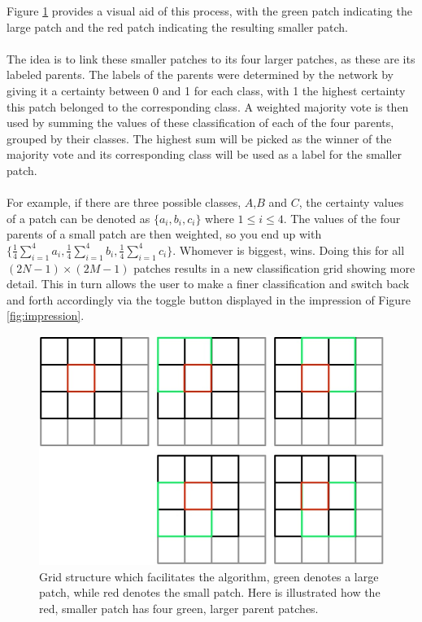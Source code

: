 \documentclass[a4paper,onecolumn]{report}
\begin{document}
Figure \ref{fig:grid} provides a visual aid of this process, with the green patch indicating the large patch and the red patch indicating the resulting smaller patch.\\
\\
The idea is to link these smaller patches to its four larger patches, as these are its labeled parents. The labels of the parents were determined by the network by giving it a certainty between 0 and 1 for each class, with 1 the highest certainty this patch belonged to the corresponding class.
A weighted majority vote is then used by summing the values of these classification of each of the four parents, grouped by their classes. The highest sum will be picked as the winner of the majority vote and its corresponding class will be used as a label for the smaller patch.\\
\\
For example, if there are three possible classes, $A$,$B$ and $C$, the certainty values of a patch can be denoted as $\{a_i, b_i, c_i\}$ where $1 \leq i \leq 4$. The values of the four parents of a small patch are then weighted, so you end up with $\{ \frac{1}{4}\sum_{i=1}^{4} a_i, \frac{1}{4}\sum_{i=1}^{4} b_i, \frac{1}{4}\sum_{i=1}^{4} c_i\}$. Whomever is biggest, wins. Doing this for all $(2N - 1) \times (2M - 1)$ patches results in a new classification grid showing more detail. This in turn allows the user to make a finer classification and switch back and forth accordingly via the toggle button displayed in the impression of Figure \ref{fig:impression}.

\begin{figure}[h!]
    \centering
    \includegraphics[scale=0.6]{./images/grid_explained.jpg}
    \caption{Grid structure which facilitates the algorithm, green denotes a large patch, while red denotes the small patch. Here is illustrated how the red, smaller patch has four green, larger parent patches.}
	\label{fig:grid}
\end{figure}
\end{document}
